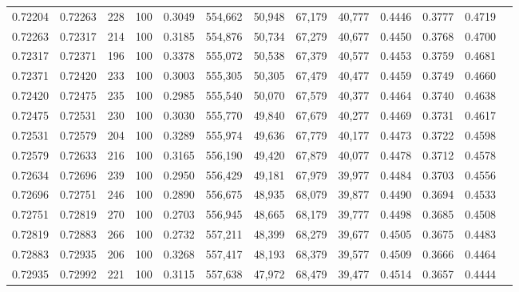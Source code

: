 \begin{tabular}{rrrrrrrrrrrrr}
0.72204 & 0.72263 &   228 & 100 &                                     0.3049 & 554,662 &  50,948 &  67,179 &  40,777 & 0.4446 & 0.3777 & 0.4719 \\
0.72263 & 0.72317 &   214 & 100 &                                     0.3185 & 554,876 &  50,734 &  67,279 &  40,677 & 0.4450 & 0.3768 & 0.4700 \\
0.72317 & 0.72371 &   196 & 100 &                                     0.3378 & 555,072 &  50,538 &  67,379 &  40,577 & 0.4453 & 0.3759 & 0.4681 \\
0.72371 & 0.72420 &   233 & 100 &                                     0.3003 & 555,305 &  50,305 &  67,479 &  40,477 & 0.4459 & 0.3749 & 0.4660 \\
0.72420 & 0.72475 &   235 & 100 &                                     0.2985 & 555,540 &  50,070 &  67,579 &  40,377 & 0.4464 & 0.3740 & 0.4638 \\
0.72475 & 0.72531 &   230 & 100 &                                     0.3030 & 555,770 &  49,840 &  67,679 &  40,277 & 0.4469 & 0.3731 & 0.4617 \\
0.72531 & 0.72579 &   204 & 100 &                                     0.3289 & 555,974 &  49,636 &  67,779 &  40,177 & 0.4473 & 0.3722 & 0.4598 \\
0.72579 & 0.72633 &   216 & 100 &                                     0.3165 & 556,190 &  49,420 &  67,879 &  40,077 & 0.4478 & 0.3712 & 0.4578 \\
0.72634 & 0.72696 &   239 & 100 &                                     0.2950 & 556,429 &  49,181 &  67,979 &  39,977 & 0.4484 & 0.3703 & 0.4556 \\
0.72696 & 0.72751 &   246 & 100 &                                     0.2890 & 556,675 &  48,935 &  68,079 &  39,877 & 0.4490 & 0.3694 & 0.4533 \\
0.72751 & 0.72819 &   270 & 100 &                                     0.2703 & 556,945 &  48,665 &  68,179 &  39,777 & 0.4498 & 0.3685 & 0.4508 \\
0.72819 & 0.72883 &   266 & 100 &                                     0.2732 & 557,211 &  48,399 &  68,279 &  39,677 & 0.4505 & 0.3675 & 0.4483 \\
0.72883 & 0.72935 &   206 & 100 &                                     0.3268 & 557,417 &  48,193 &  68,379 &  39,577 & 0.4509 & 0.3666 & 0.4464 \\
0.72935 & 0.72992 &   221 & 100 &                                     0.3115 & 557,638 &  47,972 &  68,479 &  39,477 & 0.4514 & 0.3657 & 0.4444 \\

\end{tabular}
